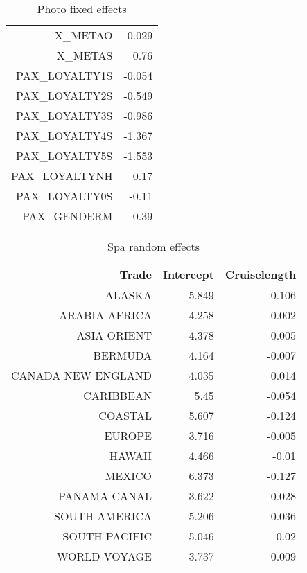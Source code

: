\documentclass{article}
\begin{document}
\begin{table}[H]
\begin{tabular}{rr}
		X\_METAO	                 &                  -0.029      \\ 
		X\_METAS	                 &                    0.76      \\ 
		PAX\_LOYALTY1S    	 &                 -0.054       \\ 
		PAX\_LOYALTY2S    	 &                 -0.549       \\ 
		PAX\_LOYALTY3S    	 &                 -0.986       \\ 
		PAX\_LOYALTY4S    	 &                 -1.367       \\ 
		PAX\_LOYALTY5S    	 &                 -1.553       \\ 
		PAX\_LOYALTYNH    	 &                 0.17         \\ 
		PAX\_LOYALTY0S	         &         -0.11                \\ 
		PAX\_GENDERM	         &         0.39                 \\ 
		\hline 
		\hline 
	\end{tabular}
	\caption{Photo fixed effects}
\end{table}

\begin{table}[H]
	\centering 
	\begin{tabular}{rrr}
		Trade & Intercept & Cruiselength \\ 
		\hline 
		\hline 
		ALASKA & 5.849 & -0.106 \\
		ARABIA AFRICA & 4.258 & -0.002 \\
		ASIA ORIENT & 4.378 & -0.005 \\
		BERMUDA & 4.164 & -0.007 \\
		CANADA NEW ENGLAND & 4.035 & 0.014 \\
		CARIBBEAN & 5.45 & -0.054 \\
		COASTAL & 5.607 & -0.124 \\
		EUROPE & 3.716 & -0.005 \\
		HAWAII & 4.466 & -0.01 \\
		MEXICO & 6.373 & -0.127 \\
		PANAMA CANAL & 3.622 & 0.028 \\
		SOUTH AMERICA & 5.206 & -0.036 \\
		SOUTH PACIFIC & 5.046 & -0.02 \\
		WORLD VOYAGE & 3.737 & 0.009 \\
		\hline 
		\hline 
	\end{tabular}
	\caption{Spa random effects}
\end{table}
\end{document}
